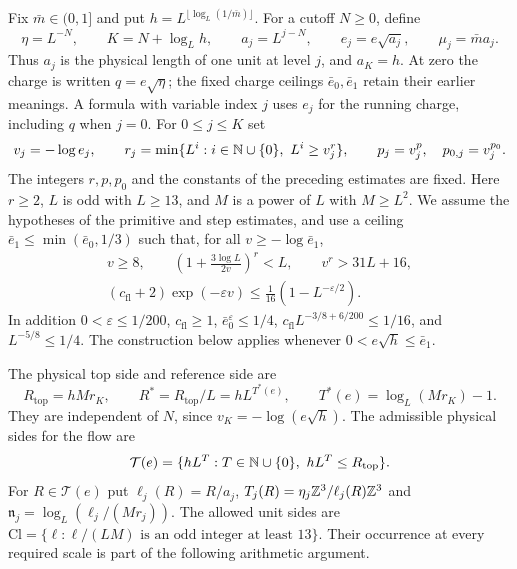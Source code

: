 Fix $\bar m\in(0,1]$ and put
$h=L^{\lfloor\log_L(1/\bar m)\rfloor}$.
For a cutoff $N\ge0$, define
\begin{equation}\label{eq:rgfl-physical-scales}
 \eta=L^{-N},\qquad K=N+\log_Lh,\qquad
 a_j=L^{j-N},\qquad e_j=e\sqrt{a_j},\qquad
 \mu_j=\bar m a_j.
\end{equation}
Thus $a_j$ is the physical length of one unit at
level $j$, and $a_K=h$.
At zero the charge is written $q=e\sqrt\eta$;
the fixed charge ceilings $\bar e_0,\bar e_1$ retain their
earlier meanings. A formula with variable index $j$
uses $e_j$ for the running charge, including $q$
when $j=0$.
For $0\le j\le K$ set
\[
 v_j=-\log e_j,\qquad
 r_j=\min\{L^i:i\in\mathbb N\cup\{0\},\ L^i\ge v_j^r\},
 \qquad p_j=v_j^p,\quad p_{0,j}=v_j^{p_0}.
\]
The integers $r,p,p_0$ and the constants of the
preceding estimates are fixed.
Here $r\ge2$, $L$ is odd with $L\ge13$, and $M$
is a power of $L$ with $M\ge L^2$.
We assume the hypotheses of the primitive and
step estimates, and use a ceiling
$\bar e_1\le\min(\bar e_0,1/3)$ such that, for all
$v\ge-\log\bar e_1$,
\begin{equation}\label{eq:rgfl-scale-smallness}
 \begin{gathered}
 v\ge8,\qquad
 \left(1+\frac{3\log L}{2v}\right)^r<L,\qquad
 v^r>31L+16,\\
 (c_{\mathrm{fl}}+2)\exp(-\varepsilon v)
               \le\frac1{16}(1-L^{-\varepsilon/2}).
 \end{gathered}
\end{equation}
In addition
$0<\varepsilon\le1/200$,
$c_{\mathrm{fl}}\ge1$,
$\bar e_0^\varepsilon\le1/4$,
$c_{\mathrm{fl}}L^{-3/8+6/200}\le1/16$, and
$L^{-5/8}\le1/4$.
The construction below applies whenever
$0<e\sqrt h\le\bar e_1$.

The physical top side and reference side are
\begin{equation}\label{eq:rgfl-reference-sides}
 R_{\mathrm{top}}=hMr_K,\qquad
 R^*=R_{\mathrm{top}}/L=hL^{T^*(e)},\qquad
 T^*(e)=\log_L(Mr_K)-1.
\end{equation}
They are independent of $N$, since
$v_K=-\log(e\sqrt h)$.
The admissible physical sides for the flow are
\[
 \mathcal T(e)=\{hL^T:T\in\mathbb N\cup\{0\},\ hL^T\le R_{\mathrm{top}}\}.
\]
For $R\in\mathcal T(e)$ put
$\ell_j(R)=R/a_j$,
$T_j(R)=\eta_j\mathbb Z^3/\ell_j(R)\mathbb Z^3$ and
$\mathfrak n_j=\log_L(\ell_j/(Mr_j))$.
The allowed unit sides are
$\mathrm{Cl}=\{\ell:\ell/(LM)\text{ is an odd integer at least }13\}$.
Their occurrence at every required scale is part
of the following arithmetic argument.

